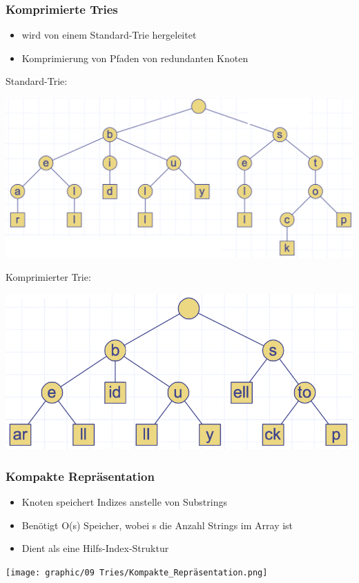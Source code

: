 \subsubsection{Komprimierte Tries}
\begin{itemize}
    \item wird von einem Standard-Trie hergeleitet
    \item Komprimierung von Pfaden von redundanten Knoten
\end{itemize}
\vspace{-8pt}
\begin{multicols}{2}
Standard-Trie:
\begin{center}
    \includegraphics[scale=.165]{graphic/09 Tries/unkomprimiert.png}
\end{center}
    \columnbreak
Komprimierter Trie:
\begin{center}
    \includegraphics[scale=.23]{graphic/09 Tries/komprimiert.png}
\end{center}
\end{multicols}
\vspace{-8pt}
\subsubsection{Kompakte Repräsentation}
\begin{itemize}
    \item Knoten speichert Indizes anstelle von Substrings
    \item Benötigt O(s) Speicher, wobei s die Anzahl Strings im Array ist
    \item Dient als eine Hilfs-Index-Struktur
\end{itemize}
\vspace{-8pt}
\begin{center}
    \texttt{[image: graphic/09 Tries/Kompakte\_Repräsentation.png]}
\end{center}
\vspace{-8pt}



